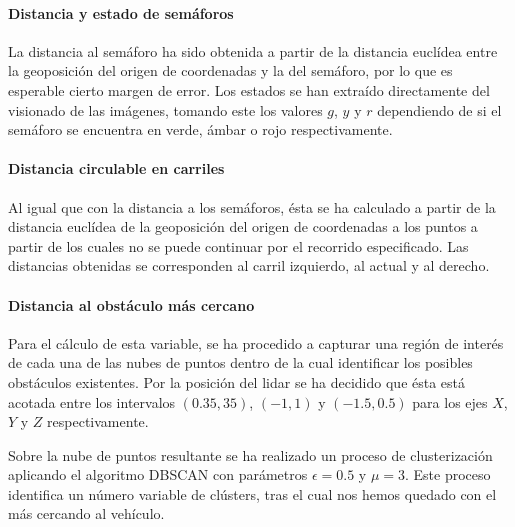 \paragraph{Distancia y estado de semáforos}

La distancia al semáforo ha sido obtenida a partir de la distancia euclídea entre la geoposición del origen de coordenadas y la del semáforo, por lo que es esperable cierto margen de error. Los estados se han extraído directamente del visionado de las imágenes, tomando este los valores $g$, $y$ y $r$ dependiendo de si el semáforo se encuentra en verde, ámbar o rojo respectivamente.

\paragraph{Distancia circulable en carriles}

Al igual que con la distancia a los semáforos, ésta se ha calculado a partir de la distancia euclídea de la geoposición del origen de coordenadas a los puntos a partir de los cuales no se puede continuar por el recorrido especificado. Las distancias obtenidas se corresponden al carril izquierdo, al actual y al derecho.

\paragraph{Distancia al obstáculo más cercano}

Para el cálculo de esta variable, se ha procedido a capturar una región de interés de cada una de las nubes de puntos dentro de la cual identificar los posibles obstáculos existentes. Por la posición del \acrshort{lidar} se ha decidido que ésta está acotada entre los intervalos $(0.35, 35)$, $(-1, 1)$ y $(-1.5, 0.5)$ para los ejes $X$, $Y$ y $Z$ respectivamente.

Sobre la nube de puntos resultante se ha realizado un proceso de clusterización aplicando el algoritmo DBSCAN con parámetros $\epsilon = 0.5$ y $\mu = 3$. Este proceso identifica un número variable de clústers, tras el cual nos hemos quedado con el más cercando al vehículo.

